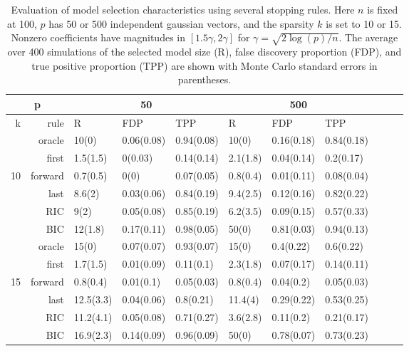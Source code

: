 
\begin{table}[ht]
\centering
\begin{tabular}{|r|r|lll|lll|lll|}
 \hline
   \multicolumn{2}{|c|}{p} & \multicolumn{3}{c|}{50}  & \multicolumn{3}{c|}{500} \\ 
  \hline \hline
    k & rule  &  R        & FDP        &  TPP          &   R      & FDP        & TPP \\ 
  \hline 
   & oracle  & 10(0)     & 0.06(0.08) & 0.94(0.08)  & 10(0) & 0.16(0.18) & 0.84(0.18) \\ 
   & first   & 1.5(1.5)  & 0(0.03)    & 0.14(0.14)  & 2.1(1.8) & 0.04(0.14) & 0.2(0.17) \\
10 & forward & 0.7(0.5)  & 0(0)       & 0.07(0.05)  & 0.8(0.4) & 0.01(0.11) & 0.08(0.04) \\
   & last    & 8.6(2)    & 0.03(0.06) & 0.84(0.19)  & 9.4(2.5) & 0.12(0.16) & 0.82(0.22) \\
   & RIC     & 9(2)      & 0.05(0.08) & 0.85(0.19)  & 6.2(3.5) & 0.09(0.15) & 0.57(0.33) \\
   & BIC     & 12(1.8)   & 0.17(0.11) & 0.98(0.05)  & 50(0) & 0.81(0.03) & 0.94(0.13) \\ 
  \hline
   & oracle  & 15(0)     & 0.07(0.07) & 0.93(0.07)  & 15(0) & 0.4(0.22) & 0.6(0.22) \\   
   & first   & 1.7(1.5)  & 0.01(0.09) & 0.11(0.1)   & 2.3(1.8) & 0.07(0.17) & 0.14(0.11) \\
15 & forward & 0.8(0.4)  & 0.01(0.1)  & 0.05(0.03)  & 0.8(0.4) & 0.04(0.2) & 0.05(0.03) \\
   & last    & 12.5(3.3) & 0.04(0.06) & 0.8(0.21)   & 11.4(4) & 0.29(0.22) & 0.53(0.25) \\
   & RIC     & 11.2(4.1) & 0.05(0.08) & 0.71(0.27)  & 3.6(2.8) & 0.11(0.2) & 0.21(0.17) \\
   & BIC     & 16.9(2.3) & 0.14(0.09) & 0.96(0.09)  & 50(0) & 0.78(0.07) & 0.73(0.23) \\ 

  \hline
\end{tabular}
\caption{Evaluation of model selection characteristics using several stopping rules.
  Here $n$ is fixed at 100, $p$ has 50 or 500 independent gaussian vectors,
  and the sparsity $k$ is set to 10 or 15.
  Nonzero coefficients have magnitudes in $[1.5\gamma, 2\gamma]$ for
  $\gamma = \sqrt{2\log (p)/n}$. The average over 400 simulations of the selected model
  size  (R), false discovery proportion  (FDP), and true positive proportion  (TPP)
  are shown with Monte Carlo standard errors in parentheses.}
\label{tab:easy}
\end{table}

